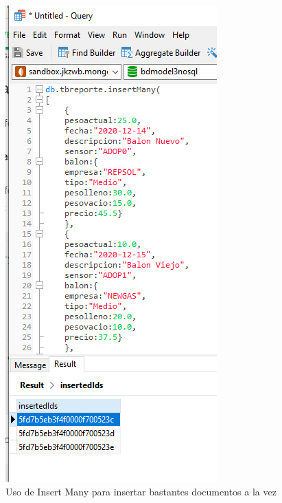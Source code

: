 \documentclass[twoside,twocolumn]{article}
\begin{document}
\begin{itemize}
\begin{figure}[h!]
\centering
\includegraphics[scale=0.35]{Image/InsertManey.PNG}
\caption{Uso de Insert Many para insertar bastantes documentos a la vez}
\label{fig:Csha3}
\end{figure}


\end{itemize}
\end{document}
